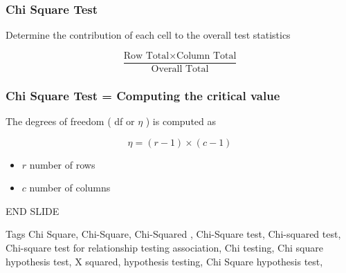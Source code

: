 \begin{frame}
\frametitle{Chi Square Test}
Determine the contribution of each cell to the overall test statistics


\[  \frac{\mbox{Row Total}\times \mbox{Column Total}}{\mbox{Overall Total}} \]

\end{frame}
\begin{frame}
\frametitle{Chi Square Test = Computing the critical value}
The degrees of freedom ( df or $\eta$ ) is computed as

\[ \eta = (r-1)\times(c-1) \]

\begin{itemize}
\item $r$ number of rows
\item $c$ number of columns
\end{itemize}
\end{frame}

\begin{frame}

END SLIDE


\end{frame}


Tags
Chi Square, Chi-Square, Chi-Squared , Chi-Square test, Chi-squared test, Chi-square test for relationship
testing association, Chi testing, Chi square hypothesis test, X squared, hypothesis testing,
Chi Square hypothesis test,
